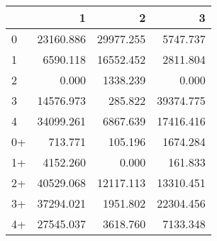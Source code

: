 \begin{tabular}{lrrr}
\toprule
     &         1 &         2 &         3 \\
\midrule
 0   & \num{23160.886} & \num{29977.255} &  \num{5747.737} \\
 1   &  \num{6590.118} & \num{16552.452} &  \num{2811.804} \\
 2   &     \num{0.000} &  \num{1338.239} &     \num{0.000} \\
 3   & \num{14576.973} &   \num{285.822} & \num{39374.775} \\
 4   & \num{34099.261} &  \num{6867.639} & \num{17416.416} \\
 0+  &   \num{713.771} &   \num{105.196} &  \num{1674.284} \\
 1+  &  \num{4152.260} &     \num{0.000} &   \num{161.833} \\
 2+  & \num{40529.068} & \num{12117.113} & \num{13310.451} \\
 3+  & \num{37294.021} &  \num{1951.802} & \num{22304.456} \\
 4+  & \num{27545.037} &  \num{3618.760} &  \num{7133.348} \\
\bottomrule
\end{tabular}